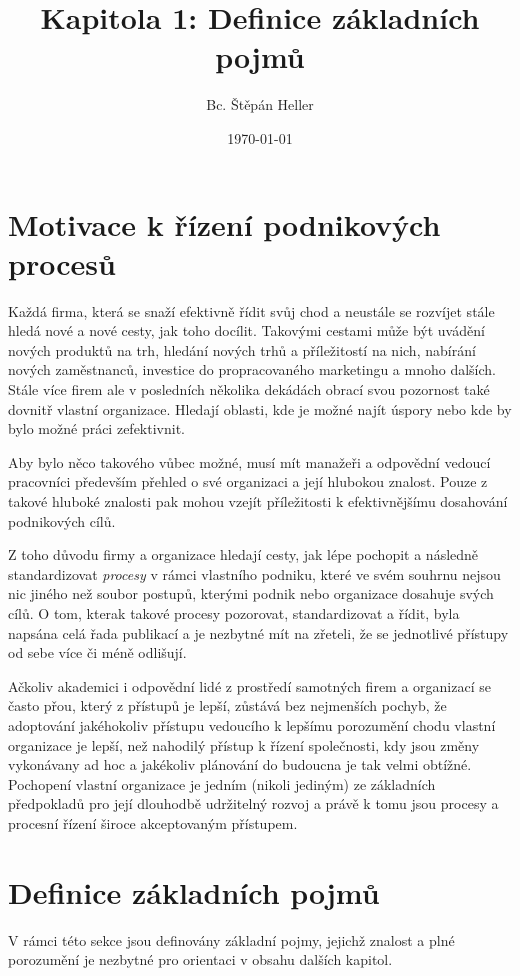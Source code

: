 \documentclass[]{article}
\begin{document}
\title{Kapitola 1: Definice základních pojmů}
\author{Bc. Štěpán Heller}
\date{\today}
\maketitle

\section{Motivace k řízení podnikových procesů}
Každá firma, která se snaží efektivně řídit svůj chod a neustále se rozvíjet stále hledá nové a nové cesty, jak toho docílit. Takovými cestami může být uvádění nových produktů na trh, hledání nových trhů a příležitostí na nich, nabírání nových zaměstnanců, investice do propracovaného marketingu a mnoho dalších. Stále více firem ale v posledních několika dekádách obrací svou pozornost také dovnitř vlastní organizace. Hledají oblasti, kde je možné najít úspory nebo kde by bylo možné práci zefektivnit.

Aby bylo něco takového vůbec možné, musí mít manažeři a odpovědní vedoucí pracovníci především přehled o své organizaci a její hlubokou znalost. Pouze z takové hluboké znalosti pak mohou vzejít příležitosti k efektivnějšímu dosahování podnikových cílů.

Z toho důvodu firmy a organizace hledají cesty, jak lépe pochopit a následně standardizovat \textit{procesy} v rámci vlastního podniku, které ve svém souhrnu nejsou nic jiného než soubor postupů, kterými podnik nebo organizace dosahuje svých cílů. O tom, kterak takové procesy pozorovat, standardizovat a řídit, byla napsána celá řada publikací a je nezbytné mít na zřeteli, že se jednotlivé přístupy od sebe více či méně odlišují. 

Ačkoliv akademici i odpovědní lidé z prostředí samotných firem a organizací se často přou, který z přístupů je lepší, zůstává bez nejmenších pochyb, že adoptování jakéhokoliv přístupu vedoucího k lepšímu porozumění chodu vlastní organizace je lepší, než nahodilý přístup k řízení společnosti, kdy jsou změny vykonávany ad hoc a jakékoliv plánování do budoucna je tak velmi obtížné. Pochopení vlastní organizace je jedním (nikoli jediným) ze základních předpokladů pro její dlouhodbě udržitelný rozvoj a právě k tomu jsou procesy a procesní řízení široce akceptovaným přístupem.

\section{Definice základních pojmů}
V rámci této sekce jsou definovány základní pojmy, jejichž znalost a plné porozumění je nezbytné pro orientaci v obsahu dalších kapitol.
\end{document}
